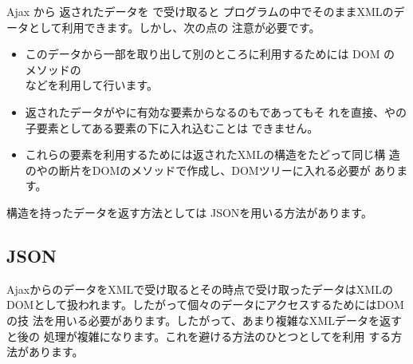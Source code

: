 Ajax から 返されたデータを  で受け取ると
プログラムの中でそのままXMLのデータとして利用できます。しかし、次の点の
注意が必要です。
\begin{itemize}
 \item このデータから一部を取り出して別のところに利用するためには DOM の
       メソッドの\\などを利用して行います。
 \item 返されたデータが\SVG や\HTML に有効な要素からなるのもであってもそ
       れを直接、\SVG や\HTML の子要素としてある要素の下に入れ込むことは
       できません。
 \item これらの要素を利用するためには返されたXMLの構造をたどって同じ構
造の\SVG や\HTML の断片をDOMのメソッドで作成し、DOMツリーに入れる必要が
       あります。
\end{itemize}
構造を持ったデータを返す方法としては
JSONを用いる方法があります。
\iffalse
\subsection{JSON}
AjaxからのデータをXMLで受け取るとその時点で受け取ったデータはXMLの
DOMとして扱われます。したがって個々のデータにアクセスするためにはDOMの技
法を用いる必要があります。したがって、あまり複雑なXMLデータを返すと後の
処理が複雑になります。これを避ける方法のひとつとしてを利用
する方法があります。


